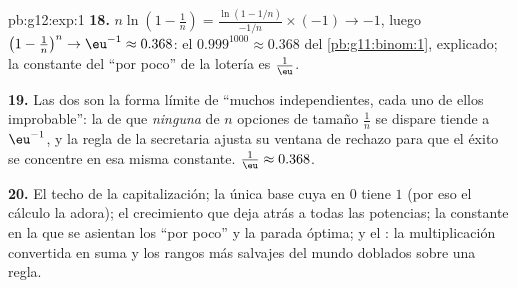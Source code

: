 \begin{solution}{pb:g12:exp:1}
\textbf{18.} $n \ln\!\left(1 - \frac1n\right) =
\frac{\ln(1 - 1/n)}{-1/n} \times (-1) \to -1$, luego
$\left(1 - \frac1n\right)^n \to \eu^{-1} \approx 0.368$: el
$0.999^{1000} \approx 0.368$ del \cref{pb:g11:binom:1}, explicado; la
constante del ``por poco'' de la lotería es $\frac1\eu$.

\textbf{19.} Las dos son la forma límite de ``muchos 
independientes, cada uno de ellos improbable'': la  de que
\emph{ninguna} de $n$ opciones de tamaño $\frac1n$ se dispare tiende a
$\eu^{-1}$, y la regla de la secretaria ajusta su ventana de rechazo para
que el éxito se concentre en esa misma constante.
$\frac1\eu \approx 0.368$.

\textbf{20.} El techo de la capitalización; la única base cuya  en
$0$ tiene  $1$ (por eso el cálculo la adora); el crecimiento que
deja atrás a todas las potencias; la constante en la que se asientan los
``por poco'' y la parada óptima; y el : la multiplicación
convertida en suma y los rangos más salvajes del mundo doblados sobre una
regla.
\end{solution}
